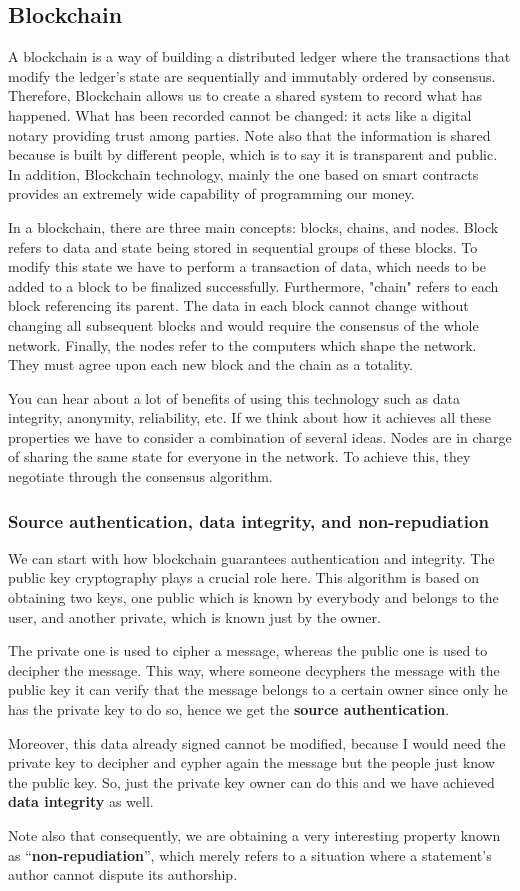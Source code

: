 
\subsection{Blockchain}
{A blockchain is a way of building a distributed ledger where the transactions that modify the ledger’s state are sequentially and immutably ordered by consensus. Therefore, Blockchain allows us to create a shared system to record what has happened. What has been recorded cannot be changed: it acts like a digital notary providing trust among parties. Note also that the information is shared because is built by different people, which is to say it is transparent and public. In addition, Blockchain technology, mainly the one based on smart contracts provides an extremely wide capability of programming our money.

In a blockchain, there are three main concepts: blocks, chains, and nodes. Block refers to data and state being stored in sequential groups of these blocks. To modify this state we have to perform a transaction of data, which needs to be added to a block to be finalized successfully. Furthermore, "chain" refers to each block referencing its parent. The data in each block cannot change without changing all subsequent blocks and would require the consensus of the whole network. Finally, the nodes refer to the computers which shape the network. They must agree upon each new block and the chain as a totality.

You can hear about a lot of benefits of using this technology such as data integrity, anonymity, reliability, etc. If we think about how it achieves all these properties we have to consider a combination of several ideas. Nodes are in charge of sharing the same state for everyone in the network. To achieve this, they negotiate through the consensus algorithm. }

\subsubsection{Source authentication, data integrity, and non-repudiation}
{We can start with how blockchain guarantees authentication and integrity. The public key cryptography plays a crucial role here. This algorithm is based on obtaining two keys, one public which is known by everybody and belongs to the user, and another private, which is known just by the owner. 

The private one is used to cipher a message, whereas the public one is used to decipher the message. This way, where someone decyphers the message with the public key it can verify that the message belongs to a certain owner since only he has the private key to do so, hence we get the \textbf{source authentication}.

Moreover, this data already signed cannot be modified, because I would need the private key to decipher and cypher again the message but the people just know the public key. So, just the private key owner can do this and we have achieved \textbf{data integrity} as well.

Note also that consequently, we are obtaining a very interesting property known as ``\textbf{non-repudiation}'', which merely refers to a situation where a statement's author cannot dispute its authorship.}

